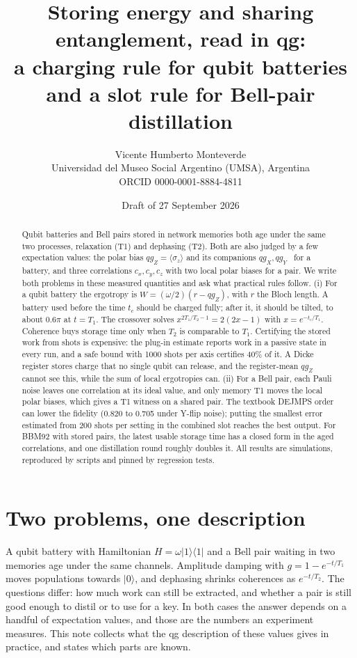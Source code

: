 \documentclass[11pt]{article}
\title{Storing energy and sharing entanglement, read in qg:\\
a charging rule for qubit batteries and a slot rule for Bell-pair distillation}
\author{Vicente Humberto Monteverde\\
\small Universidad del Museo Social Argentino (UMSA), Argentina\\
\small ORCID 0000-0001-8884-4811}
\date{\small Draft of 27 September 2026}
\newcommand{\qgZ}{qg_Z}
\newcommand{\qgX}{qg_X}
\newcommand{\qgY}{qg_Y}
\begin{document}
\maketitle

\begin{abstract}
Qubit batteries and Bell pairs stored in network memories both age under the same two
processes, relaxation (T1) and dephasing (T2). Both are also judged by a few expectation values:
the polar bias $\qgZ=\langle\sigma_z\rangle$ and its companions $\qgX,\qgY$~\cite{monteverde2026qang}
for a battery, and three correlations $c_x,c_y,c_z$ with two local polar biases for a pair. We
write both problems in these measured quantities and ask what practical rules follow. (i) For a
qubit battery the ergotropy is $W=(\omega/2)(r-\qgZ)$, with $r$ the Bloch length. A battery used
before the time $t_c$ should be charged fully; after it, it should be tilted, to about $0.6\pi$ at
$t=T_1$. The crossover solves $x^{2T_1/T_2-1}=2(2x-1)$ with $x=e^{-t_c/T_1}$. Coherence buys storage
time only when $T_2$ is comparable to $T_1$. Certifying the stored work from shots is expensive: the
plug-in estimate reports work in a passive state in every run, and a safe bound with 1000 shots per
axis certifies 40\% of it. A Dicke register stores charge that no single qubit can release, and the
register-mean $\qgZ$ cannot see this, while the sum of local ergotropies can. (ii) For a Bell pair,
each Pauli noise leaves one correlation at its ideal value, and only memory T1 moves the local polar
biases, which gives a T1 witness on a shared pair. The textbook DEJMPS order can lower the
fidelity (0.820 to 0.705 under Y-flip noise); putting the smallest error estimated from 200 shots per
setting in the combined slot reaches the best output. For BBM92 with stored pairs, the latest usable
storage time has a closed form in the aged correlations, and one distillation round roughly doubles
it. All results are simulations, reproduced by scripts and pinned by regression tests.
\end{abstract}

\section{Two problems, one description}

A qubit battery with Hamiltonian $H=\omega|1\rangle\langle1|$ and a Bell pair waiting in two
memories age under the same channels. Amplitude damping with $g=1-e^{-t/T_1}$ moves populations
towards $|0\rangle$, and dephasing shrinks coherences as $e^{-t/T_2}$. The questions differ: how much
work can still be extracted, and whether a pair is still good enough to distil or to use for a key.
In both cases the answer depends on a handful of expectation values, and those are the numbers an
experiment measures. This note collects what the qg description of these values gives in practice,
and states which parts are known.
\end{document}
